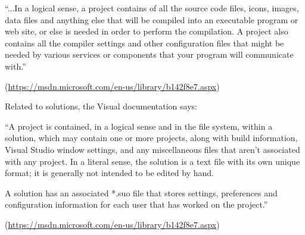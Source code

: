\begin{center}
    \begin{minipage}{0.7\linewidth}
        \vspace{3pt}
        {\small
            ``...In a logical sense, a project contains of all the source code files, icons, images, data files and anything else that will be compiled into an executable program or web site, or else is needed in order to perform the compilation. A project also contains all the compiler settings and other configuration files that might be needed by various services or components that your program will communicate with.''
        }
        \begin{flushright}
            (\url{https://msdn.microsoft.com/en-us/library/b142f8e7.aspx})
        \end{flushright}
        \vspace{3pt}
    \end{minipage}
\end{center}

\newpage
Related to solutions, the Visual documentation says: 

\begin{center}
    \begin{minipage}{0.7\linewidth}
        \vspace{3pt}
        {\small
            ``A project is contained, in a logical sense and in the file system, within a solution, which may contain one or more projects, along with build information, Visual Studio window settings, and any miscellaneous files that aren't associated with any project. In a literal sense, the solution is a text file with its own unique format; it is generally not intended to be edited by hand.
            
            A solution has an associated *.suo file that stores settings, preferences and configuration information for each user that has worked on the project.''
        }
        \begin{flushright}
            (\url{https://msdn.microsoft.com/en-us/library/b142f8e7.aspx})
        \end{flushright}
        \vspace{3pt}
    \end{minipage}
\end{center}



